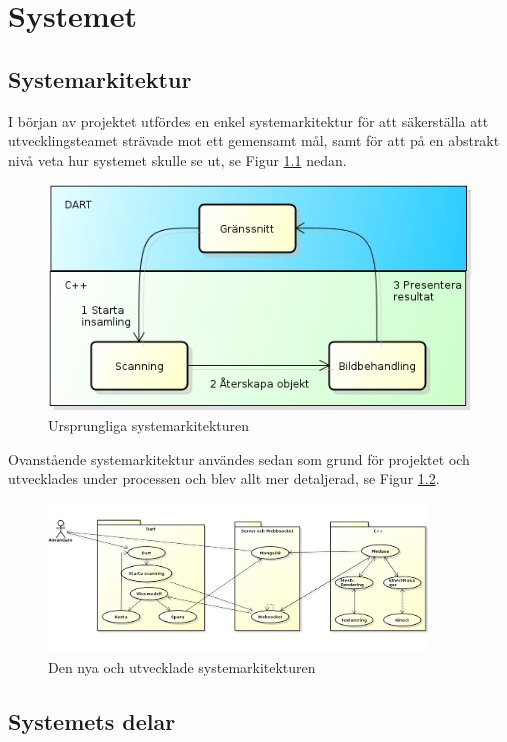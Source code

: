 \documentclass[a4paper,12pt,oneside,final]{extbook}
\begin{document}
\chapter{Systemet}
\section{Systemarkitektur}
I början av projektet utfördes en enkel systemarkitektur för att säkerställa att utvecklingsteamet strävade mot ett gemensamt mål, samt för att på en abstrakt nivå veta hur systemet skulle se ut, se Figur \ref{fig:oldArch} nedan.

\begin{figure}[ht]
  \centering
  \includegraphics[width=.9\textwidth]{bilder/oldarch.png}
  \caption{Ursprungliga systemarkitekturen}
  \label{fig:oldArch}
\end{figure}

Ovanstående systemarkitektur användes sedan som grund för projektet och utvecklades under processen och blev allt mer detaljerad, se Figur \ref{fig:newArch}.

\begin{figure}[ht]
  \centering
  \includegraphics[width=0.9\textwidth]{bilder/newarch.png}
  \caption{Den nya och utvecklade systemarkitekturen}
  \label{fig:newArch}
\end{figure}

\section{Systemets delar}
\end{document}
